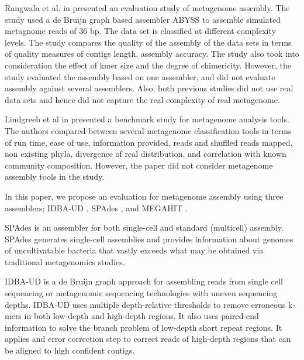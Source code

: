 \documentclass[10pt,a4paper,twocolumn]{article}
\begin{document}
Rangwala et al. in \cite{huzefa2011} presented an evaluation study of
metagenome assembly. The study used a de Bruijn graph based assembler
ABYSS \cite{abyss} to assemble simulated metagnome reads of 36 bp. The
data set is classified at different complexity levels.
The study compares the quality of the assembly of the data sets in
terms of quality measures of contigs length, assembly accuracy. The
study also took into consideration the effect of kmer size and the
degree of chimericity.  However, the study evaluated the assembly
based on one assembler, and did not evaluate assembly against several
assemblers.  Also, both previous studies did not use real data sets
and hence did not capture the real complexity of real metagenome.
 
 Lindgreeb et al in \cite{metaclass} presented a benchmark study for
 metagenome analysis tools. The authors compared between several
 metagenome classification tools in terms of run time, ease of use,
 information provided, reads and shuffled reads mapped, non existing
 phyla, divergence of real distribution, and correlation with known
 community composition. However, the paper did not consider metagenome
 assembly tools in the study.
 
 
In this paper, we propose an evaluation for metagenome assembly using
three assemblers; IDBA-UD \cite{idba}, SPAdes \cite {spades}, and
MEGAHIT \cite{megahit} .


SPAdes \cite{spades} is an assembler for both single-cell and standard
(multicell) assembly. SPAdes generates single-cell assemblies and
provides information about genomes of uncultivatable bacteria that
vastly exceeds what may be obtained via traditional metagenomics
studies.

IDBA-UD \cite{idba} is a de Bruijn graph approach for assembling reads
from single cell sequencing or metagenomic sequencing technologies
with uneven sequencing depths. IDBA-UD uses multiple depth-relative
thresholds to remove erroneous k-mers in both low-depth and high-depth
regions. It also uses paired-end information to solve the branch
problem of low-depth short repeat regions. It applies and error
correction step to correct reads of high-depth regions that can be
aligned to high confident contigs.
\end{document}
